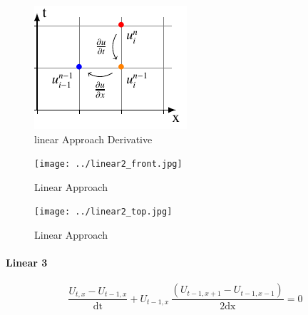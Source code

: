 \documentclass[12pt]{article}
\begin{document}
        \begin{figure}[!ht]
          \centering
          \includegraphics[width=.8\textwidth]{../tikz/linear2/linear2.pdf}
          \caption{linear Approach Derivative}
          \label{fig:STDL}
        \end{figure}

        \begin{figure}[!ht]
            \begin{minipage}[b]{0.5\textwidth}
              \texttt{[image: ../linear2\_front.jpg]}
              \caption{Linear Approach}
              \label{fig:STDL}
            \end{minipage}
            \begin{minipage}[b]{0.5\textwidth}
              \texttt{[image: ../linear2\_top.jpg]}
              \caption{Linear Approach}
              \label{fig:STDL}
            \end{minipage}
        \end{figure}

        \newpage

    \paragraph{Linear 3}

        \begin{equation}
            \frac{U_{t,x}-U_{t-1,x}}{\mathrm{dt}}+ U_{t-1,x}\, \frac{\left(U_{t-1,x+1}-U_{t-1,x-1}\right)}{2\mathrm{dx}}=0
        \end{equation}
\end{document}
